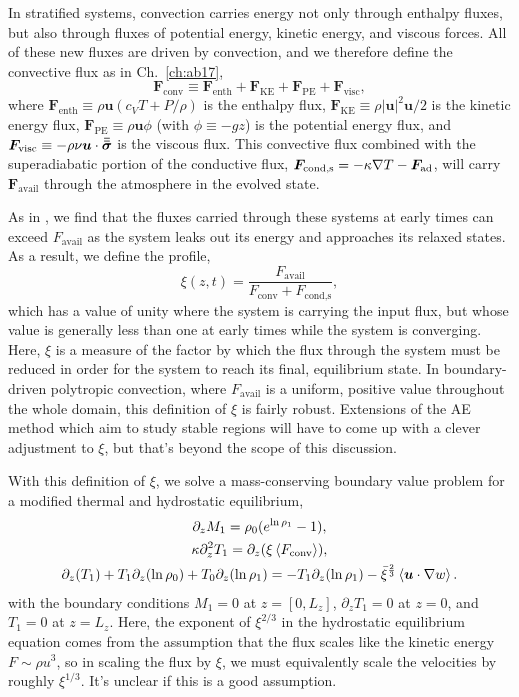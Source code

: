 In stratified systems, convection carries energy not only through enthalpy fluxes, but also through fluxes of potential energy, kinetic energy, and viscous forces.
All of these new fluxes are driven by convection, and we therefore define the convective flux as in Ch.~\ref{ch:ab17},
\begin{equation}
\bm{F}_{\text{conv}} \equiv \bm{F}_{\text{enth}} + \bm{F}_{\text{KE}} + \bm{F}_{\text{PE}} + \bm{F}_{\text{visc}},
\end{equation}
where $\bm{F}_{\text{enth}} \equiv \rho\bm{u}(c_V T + P/\rho)$ is the enthalpy flux, $\bm{F}_{\text{KE}} \equiv \rho|\bm{u}|^2\bm{u}/2$ is the kinetic energy flux, $\bm{F}_{\text{PE}} \equiv \rho\bm{u}\phi$ (with $\phi \equiv -gz$) is the potential energy flux, and $\bm{F}_{\text{visc}} \equiv -\rho\nu\bm{u}\cdot\bm{\bar{\bar{\sigma}}}$ is the viscous flux.
This convective flux combined with the superadiabatic portion of the conductive flux, $\bm{F}_{\text{cond,s}} = -\kappa \nabla T - \bm{F}_{\text{ad}}$, will carry $\bm{F}_{\text{avail}}$ through the atmosphere in the evolved state.

As in \citet{anders&all2018}, we find that the fluxes carried through these systems at early times can exceed $F_{\text{avail}}$ as the system leaks out its energy and approaches its relaxed states.
As a result, we define the profile,
\begin{equation}
\xi(z, t) = \frac{F_{\text{avail}}}{F_{\text{conv}} + F_{\text{cond,s}}},
\label{eqn:xi}
\end{equation}
which has a value of unity where the system is carrying the input flux, but whose value is generally less than one at early times while the system is converging.
Here, $\xi$ is a measure of the factor by which the flux through the system must be reduced in order for the system to reach its final, equilibrium state.
In boundary-driven polytropic convection, where $F_{\text{avail}}$ is a uniform, positive value throughout the whole domain, this definition of $\xi$ is fairly robust.
Extensions of the AE method which aim to study stable regions will have to come up with a clever adjustment to $\xi$, but that's beyond the scope of this discussion.

With this definition of $\xi$, we solve a mass-conserving boundary value problem for a modified thermal and hydrostatic equilibrium,
\begin{gather}
\partial_z M_1 = \rho_0(e^{\ln\rho_1} - 1), \\
\kappa\partial_z^2 T_1 = \partial_z(\xi \left\langle F_{\text{conv}} \right\rangle), \\
\partial_z(T_1) + T_1 \partial_z(\ln\rho_0) + T_0\partial_z(\ln\rho_1) = -T_1\partial_z(\ln\rho_1) - \bar{\xi}^{\frac{2}{3}}\left\langle \bm{u}\cdot\nabla w \right\rangle.
\end{gather}
with the boundary conditions $M_1 = 0$ at $z = [0, L_z]$, $\partial_z T_1 = 0$ at $z = 0$, and $T_1 = 0$ at $z = L_z$.
Here, the exponent of $\xi^{2/3}$ in the hydrostatic equilibrium equation comes from the assumption that the flux scales like the kinetic energy $F \sim \rho u^3$, so in scaling the flux by $\xi$, we must equivalently scale the velocities by roughly $\xi^{1/3}$.
It's unclear if this is a good assumption.

